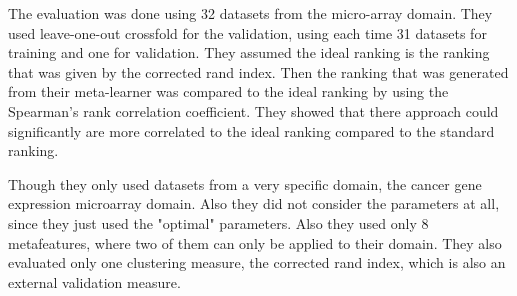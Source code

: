 The evaluation was done using 32 datasets from the micro-array domain.
They used leave-one-out crossfold for the validation, using each time 31 datasets for training and one for validation.
They assumed the ideal ranking is the ranking that was given by the corrected rand index.
Then the ranking that was generated from their meta-learner was compared to the ideal ranking by using the Spearman's rank correlation coefficient.
They showed that there approach could significantly are more correlated to the ideal ranking compared to the standard ranking.

Though they only used datasets from a very specific domain, the cancer gene expression microarray domain.
Also they did not consider the parameters at all, since they just used the "optimal" parameters.
Also they used only 8 metafeatures, where two of them can only be applied to their domain.
They also evaluated only one clustering measure, the corrected rand index, which is also an external validation measure.

